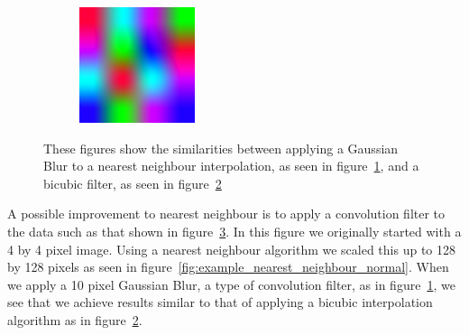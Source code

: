 \begin{figure}
\begin{subfigure}{.333\textwidth}
                    \caption{}
                    \label{fig:example_nearest_neighbour_blur}
                \end{subfigure}%
                \begin{subfigure}{.333\textwidth}
                    \centering
                    \includegraphics[width=0.9\linewidth]{./images/Nearest_Neighbour_Bicubic.png}
                    \caption{}
                    \label{fig:example_nearest_neighbour_bicubic}
                \end{subfigure}
                \caption{These figures show the similarities between applying a Gaussian Blur to a nearest neighbour interpolation, as seen in figure~\ref{fig:example_nearest_neighbour_blur}, and a bicubic filter, as seen in figure~\ref{fig:example_nearest_neighbour_bicubic}}
                \label{fig:example_nearest_neighbour}
            \end{figure}

            A possible improvement to nearest neighbour is to apply a convolution filter to the data such as that shown in figure~\ref{fig:example_nearest_neighbour}. In this figure we originally started with a 4 by 4 pixel image. Using a nearest neighbour algorithm we scaled this up to 128 by 128 pixels as seen in figure~\ref{fig:example_nearest_neighbour_normal}. When we apply a 10 pixel Gaussian Blur, a type of convolution filter, as in figure~\ref{fig:example_nearest_neighbour_blur}, we see that we achieve results similar to that of applying a bicubic interpolation algorithm as in figure~\ref{fig:example_nearest_neighbour_bicubic}.



